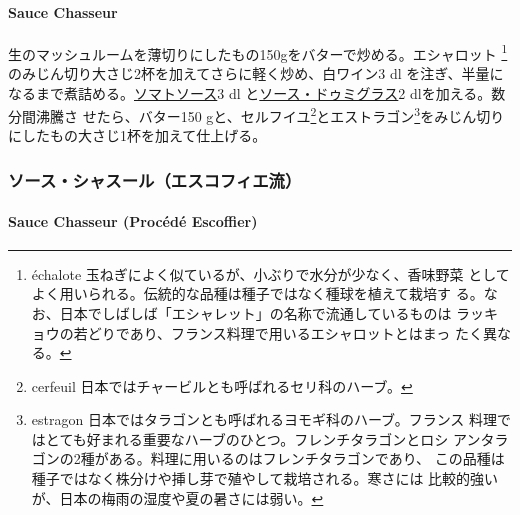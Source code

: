 \begin{recette}
\hypertarget{sauce-chasseur}{%
\paragraph{Sauce Chasseur}\label{sauce-chasseur}}


生のマッシュルームを薄切りにしたもの150gをバターで炒める。エシャロット
\footnote{échalote
  玉ねぎによく似ているが、小ぶりで水分が少なく、香味野菜
  としてよく用いられる。伝統的な品種は種子ではなく種球を植えて栽培す
  る。なお、日本でしばしば「エシャレット」の名称で流通しているものは
  ラッキョウの若どりであり、フランス料理で用いるエシャロットとはまっ
  たく異なる。}のみじん切り大さじ2\undemi{}杯を加えてさらに軽く炒め、白ワイン3
dl
を注ぎ、半量になるまで煮詰める。\protect\hyperlink{sauce-tomate}{ソマトソース}3
dl と\protect\hyperlink{sauce-demi-glace}{ソース・ドゥミグラス}2
dlを加える。数分間沸騰さ せたら、バター150 gと、セルフイユ\footnote{cerfeuil
  日本ではチャービルとも呼ばれるセリ科のハーブ。}とエストラゴン\footnote{estragon
  日本ではタラゴンとも呼ばれるヨモギ科のハーブ。フランス
  料理ではとても好まれる重要なハーブのひとつ。フレンチタラゴンとロシ
  アンタラゴンの2種がある。料理に用いるのはフレンチタラゴンであり、
  この品種は種子ではなく株分けや挿し芽で殖やして栽培される。寒さには
  比較的強いが、日本の梅雨の湿度や夏の暑さには弱い。}をみじん切り
にしたもの大さじ1\undemi{}杯を加えて仕上げる。

\maeaki

\hypertarget{ux30bdux30fcux30b9ux30b7ux30e3ux30b9ux30fcux30ebux30a8ux30b9ux30b3ux30d5ux30a3ux30a8ux6d41}{%
\subsubsection{ソース・シャスール（エスコフィエ流）}\label{ux30bdux30fcux30b9ux30b7ux30e3ux30b9ux30fcux30ebux30a8ux30b9ux30b3ux30d5ux30a3ux30a8ux6d41}}

\hypertarget{sauce-chasseur-procede-escoffier}{%
\paragraph{Sauce Chasseur (Procédé
Escoffier)}\label{sauce-chasseur-procede-escoffier}}


\end{recette}
